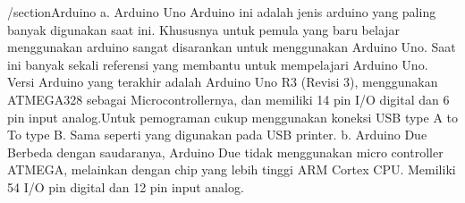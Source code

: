 /section{Arduino}
a. Arduino Uno
 Arduino ini adalah jenis arduino yang paling banyak digunakan saat ini. Khususnya untuk pemula yang baru belajar menggunakan arduino sangat disarankan untuk menggunakan Arduino Uno. Saat ini banyak sekali referensi yang membantu untuk mempelajari Arduino Uno. Versi Arduino yang terakhir adalah Arduino Uno R3 (Revisi 3), menggunakan ATMEGA328 sebagai Microcontrollernya, dan memiliki 14 pin I/O digital dan 6 pin input analog.Untuk pemograman cukup menggunakan koneksi USB type A to To type B. Sama seperti yang digunakan pada USB printer.
b. Arduino Due
Berbeda dengan saudaranya, Arduino Due tidak menggunakan micro controller ATMEGA, melainkan dengan chip yang lebih tinggi ARM Cortex CPU. Memiliki 54 I/O pin digital dan 12 pin input analog.